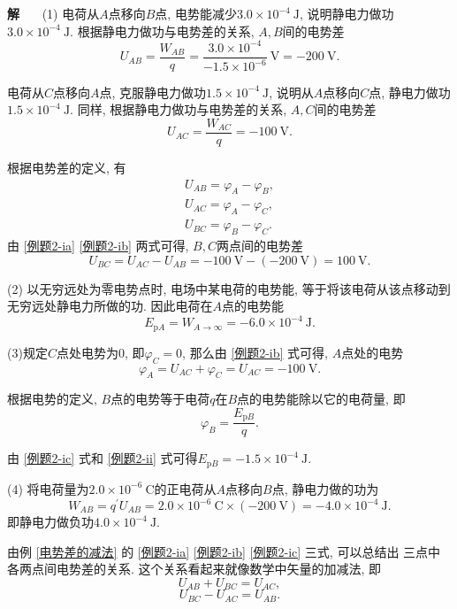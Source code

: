 \documentclass[11pt,a4paper]{ctexbook}
\newcommand{\bre}{\ \ \ }
\newcommand{\soln}{\textbf{解}\bre}
\newcommand{\unit}[1]{\ \mathrm{#1}}
\newenvironment{solution}{\par\soln}{\par\bigskip}
\begin{document}
\begin{solution}
    (1) 电荷从$A$点移向$B$点,
    电势能减少$3.0\times 10^{-4}\unit{J}$, 说明静电力做功$3.0\times 10^{-4}\unit{J}$.
    根据静电力做功与电势差的关系, $A, B$间的电势差
    $$U_{AB} = \frac{W_{AB}}{q} = \frac{3.0\times 10^{-4}}{-1.5\times 10^{-6}}\unit{V} = -200\unit{V}.$$

    电荷从$C$点移向$A$点, 克服静电力做功$1.5\times 10^{-4}\unit{J}$, 说明从$A$点移向$C$点,
    静电力做功$1.5\times 10^{-4}\unit{J}$. 同样, 根据静电力做功与电势差的关系, $A, C$间的电势差
    $$U_{AC} = \frac{W_{AC}}{q} = -100\unit{V}.$$

    根据电势差的定义, 有
    \begin{align*}
        U_{AB} = \varphi_A - \varphi_B, \tag{i - a}\label{例题2-ia} \\
        U_{AC} = \varphi_A - \varphi_C, \tag{i - b}\label{例题2-ib} \\
        U_{BC} = \varphi_B - \varphi_C.\tag{i - c}\label{例题2-ic}
    \end{align*}
    由 \eqref{例题2-ia} \eqref{例题2-ib} 两式可得, $B, C$两点间的电势差
    $$U_{BC} = U_{AC} - U_{AB} = -100\unit{V} - (-200\unit{V}) = 100\unit{V}.$$

    (2) 以无穷远处为零电势点时, 电场中某电荷的电势能, 等于将该电荷从该点移动到无穷远处静电力所做的功.
    因此电荷在$A$点的电势能$$E_{\mathrm{p}A} = W_{A\rightarrow \infty} = -6.0\times 10^{-4}\unit{J}.$$

    (3)规定$C$点处电势为0, 即$\varphi_C = 0$, 那么由 \eqref{例题2-ib} 式可得, $A$点处的电势
    $$\varphi_A = U_{AC} + \varphi_C = U_{AC} = -100\unit{V}.$$

    根据电势的定义, $B$点的电势等于电荷$q$在$B$点的电势能除以它的电荷量, 即
    \begin{equation*}
        \varphi_B = \frac{E_{\mathrm{p}B}}{q}.
        \tag{ii}
        \label{例题2-ii}
    \end{equation*}

    由 \eqref{例题2-ic} 式和 \eqref{例题2-ii} 式可得$E_{\mathrm{p}B} = -1.5\times 10^{-4}\unit{J}.$

    (4) 将电荷量为$2.0\times 10^{-6}\unit{C}$的正电荷从$A$点移向$B$点, 静电力做的功为
    $$W_{AB} = q^{\prime}U_{AB} = 2.0\times 10^{-6}\unit{C}\times (-200\unit{V}) = -4.0\times 10^{-4}\unit{J}.$$
    即静电力做负功$4.0\times 10^{-4}\unit{J}$.

\end{solution}

由例 \ref{电势差的减法} 的 \eqref{例题2-ia} \eqref{例题2-ib} \eqref{例题2-ic} 三式, 可以总结出
三点中各两点间电势差的关系. 这个关系看起来就像数学中矢量的加减法, 即
$$U_{AB} + U_{BC} = U_{AC}, $$
$$U_{BC} - U_{AC} = U_{AB}. $$
\end{document}
